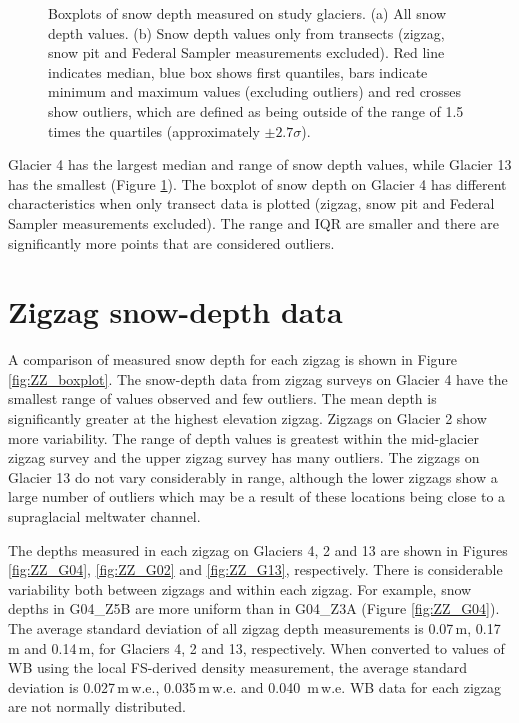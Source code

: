 \documentclass{sfuthesis}
\begin{document}
\begin{figure}[H]
    \caption[Boxplots of snow depth measured on study glaciers]{Boxplots of snow depth measured on study glaciers. (a) All snow depth values. (b) Snow depth values only from transects (zigzag, snow pit and Federal Sampler measurements excluded). Red line indicates median, blue box shows first quantiles, bars indicate minimum and maximum values (excluding outliers) and red crosses show outliers, which are defined as being outside of the range of 1.5 times the quartiles (approximately $\pm2.7\sigma$).}
    \label{fig:box_depth_transects}
\end{figure}

Glacier 4 has the largest median and range of snow depth values, while Glacier 13 has the smallest (Figure \ref{fig:box_depth_transects}). The boxplot of snow depth on Glacier 4 has different characteristics when only transect data is plotted (zigzag, snow pit and Federal Sampler measurements excluded). The range and IQR are smaller and there are significantly more points that are considered outliers. 

\section{Zigzag snow-depth data}

A comparison of measured snow depth for each zigzag is shown in Figure \ref{fig:ZZ_boxplot}. The snow-depth data from zigzag surveys on Glacier 4 have the smallest range of values observed and few outliers. The mean depth is significantly greater at the highest elevation zigzag. Zigzags on Glacier 2 show more variability. The range of depth values is greatest within the mid-glacier zigzag survey and the upper zigzag survey has many outliers. The zigzags on Glacier 13 do not vary considerably in range, although the lower zigzags show a large number of outliers which may be a result of these locations being close to a supraglacial meltwater channel. 

The depths measured in each zigzag on Glaciers 4, 2 and 13 are shown in Figures \ref{fig:ZZ_G04}, \ref{fig:ZZ_G02} and \ref{fig:ZZ_G13}, respectively. There is considerable variability both between zigzags and within each zigzag. For example, snow depths in G04\_Z5B are more uniform than in G04\_Z3A (Figure \ref{fig:ZZ_G04}). The average standard deviation of all zigzag depth measurements is 0.07\,m, 0.17\,m and 0.14\,m, for Glaciers 4, 2 and 13, respectively. When converted to values of WB using the local FS-derived density measurement, the average standard deviation is 0.027\,m\,w.e., 0.035\,m\,w.e. and 0.040 \,m\,w.e. WB data for each zigzag are not normally distributed.
\end{document}
